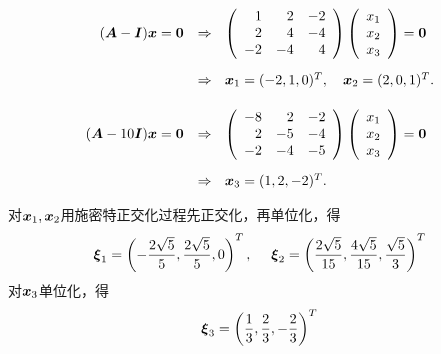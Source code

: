\begin{frame}
  
  $$
  \begin{array}{rl}
    (\MA-\MI)\vx=\M0 & \Rightarrow~~
                       \left(
                       \begin{array}{rrr}
                         1&2&-2\\
                         2&4&-4\\
                         -2&-4&4
                       \end{array}
                                \right)\left(
                                \begin{array}{c}
                                  x_1\\
                                  x_2\\
                                  x_3
                                \end{array}
    \right)=\M0\\[0.3in]  
                     & \Rightarrow~~
                       \vx_1=(-2,1,0)^T, \quad
                       \vx_2=(2,0,1)^T. \\[0.2in] 
    (\MA-10\MI)\vx=\M0 & \Rightarrow~~
                         \left(
                         \begin{array}{rrr}
                           -8&2&-2\\
                           2&-5&-4\\
                           -2&-4&-5
                         \end{array}
                                  \right)\left(
                                  \begin{array}{c}
                                    x_1\\
                                    x_2\\
                                    x_3
                                  \end{array}
    \right)=\M0\\[0.3in]  
                     & \Rightarrow~~
                       \vx_3=(1,2,-2)^T.
  \end{array}
  $$ \pause 

  对${\boldsymbol{x}}_1,{\boldsymbol{x}}_2$用施密特正交化过程先正交化，再单位化，得
  $$
  \boldsymbol{\xi}_1=\left(-\frac{2\sqrt{5}}5,\frac{2\sqrt{5}}5,0\right)^T,~~~~
  \boldsymbol{\xi}_2=\left(\frac{2\sqrt{5}}{15},\frac{4\sqrt{5}}{15},\frac{\sqrt{5}}3\right)^T
  $$ 
  对${\boldsymbol{x}}_3$单位化，得
  $$
  \boldsymbol{\xi}_3=\left(\frac13,\frac23,-\frac23\right)^T
  $$
  
\end{frame}


